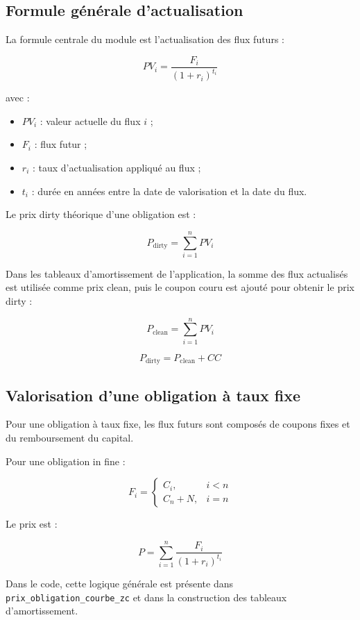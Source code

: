 \documentclass[12pt,a4paper]{article}
\begin{document}
\subsection{Formule générale d'actualisation}

La formule centrale du module est l'actualisation des flux futurs :

\[
PV_i = \frac{F_i}{(1+r_i)^{t_i}}
\]

avec :

\begin{itemize}
    \item $PV_i$ : valeur actuelle du flux $i$ ;
    \item $F_i$ : flux futur ;
    \item $r_i$ : taux d'actualisation appliqué au flux ;
    \item $t_i$ : durée en années entre la date de valorisation et la date du flux.
\end{itemize}

Le prix dirty théorique d'une obligation est :

\[
P_{\text{dirty}} = \sum_{i=1}^{n} PV_i
\]

Dans les tableaux d'amortissement de l'application, la somme des flux actualisés est utilisée comme prix clean, puis le coupon couru est ajouté pour obtenir le prix dirty :

\[
P_{\text{clean}} = \sum_{i=1}^{n} PV_i
\]

\[
P_{\text{dirty}} = P_{\text{clean}} + CC
\]

\subsection{Valorisation d'une obligation à taux fixe}

Pour une obligation à taux fixe, les flux futurs sont composés de coupons fixes et du remboursement du capital.

Pour une obligation in fine :

\[
F_i =
\begin{cases}
C_i, & i < n \\
C_n + N, & i = n
\end{cases}
\]

Le prix est :

\[
P = \sum_{i=1}^{n}
\frac{F_i}{(1+r_i)^{t_i}}
\]

Dans le code, cette logique générale est présente dans \texttt{prix\_obligation\_courbe\_zc} et dans la construction des tableaux d'amortissement.
\end{document}
